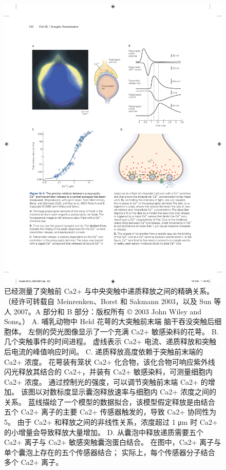 \begin{figure}[htbp]
	\centering
	\includegraphics[width=0.9\linewidth]{chap15/fig_15_5}
	\caption{已经测量了突触前 Ca2+ 与中央突触中递质释放之间的精确关系。 （经许可转载自 Meinrenken、Borst 和 Sakmann 2003，以及 Sun 等人 2007。A 部分和 B 部分：版权所有 © 2003 John Wiley and Sons。） 
	A. 哺乳动物中 Held 花萼的大突触前末端 脑干吞没突触后细胞体。 左侧的荧光图像显示了一个充满 Ca2+ 敏感染料的花萼。 B. 几个突触事件的时间进程。 虚线表示 Ca2+ 电流、递质释放和突触后电流的峰值响应时间。 C. 递质释放高度依赖于突触前末端的 Ca2+ 浓度。 花萼装有笼状 Ca2+ 化合物，该化合物可响应紫外线闪光释放其结合的 Ca2+，并装有 Ca2+ 敏感染料，可测量细胞内 Ca2+ 浓度。 通过控制光的强度，可以调节突触前末端 Ca2+ 的增加。 该图以对数标度显示囊泡释放速率与细胞内 Ca2+ 浓度之间的关系。 蓝线描绘了一个模型的数据拟合，该模型假定释放是由结合五个 Ca2+ 离子的主要 Ca2+ 传感器触发的，导致 Ca2+ 协同性为 5。 由于 Ca2+ 和释放之间的非线性关系，浓度超过 1 μm 时 Ca2+ 的小增量会导致释放大量增加。 D. 从囊泡中释放递质需要五个 Ca2+ 离子与 Ca2+ 敏感突触囊泡蛋白结合。 在图中，Ca2+ 离子与单个囊泡上存在的五个传感器结合； 实际上，每个传感器分子结合多个 Ca2+ 离子。}
	\label{fig:15_5}
\end{figure}


